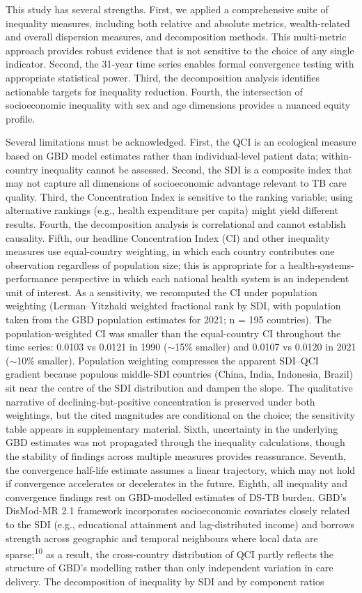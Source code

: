 \documentclass[12pt]{article}
\begin{document}
This study has several strengths. First, we applied a comprehensive suite of inequality measures, including both relative and absolute metrics, wealth-related and overall dispersion measures, and decomposition methods. This multi-metric approach provides robust evidence that is not sensitive to the choice of any single indicator. Second, the 31-year time series enables formal convergence testing with appropriate statistical power. Third, the decomposition analysis identifies actionable targets for inequality reduction. Fourth, the intersection of socioeconomic inequality with sex and age dimensions provides a nuanced equity profile.

Several limitations must be acknowledged. First, the QCI is an ecological measure based on GBD model estimates rather than individual-level patient data; within-country inequality cannot be assessed. Second, the SDI is a composite index that may not capture all dimensions of socioeconomic advantage relevant to TB care quality. Third, the Concentration Index is sensitive to the ranking variable; using alternative rankings (e.g., health expenditure per capita) might yield different results. Fourth, the decomposition analysis is correlational and cannot establish causality. Fifth, our headline Concentration Index (CI) and other inequality measures use equal-country weighting, in which each country contributes one observation regardless of population size; this is appropriate for a health-systems-performance perspective in which each national health system is an independent unit of interest. As a sensitivity, we recomputed the CI under population weighting (Lerman--Yitzhaki weighted fractional rank by SDI, with population taken from the GBD population estimates for 2021; n = 195 countries). The population-weighted CI was smaller than the equal-country CI throughout the time series: 0.0103 vs 0.0121 in 1990 ($\sim$15\% smaller) and 0.0107 vs 0.0120 in 2021 ($\sim$10\% smaller). Population weighting compresses the apparent SDI--QCI gradient because populous middle-SDI countries (China, India, Indonesia, Brazil) sit near the centre of the SDI distribution and dampen the slope. The qualitative narrative of declining-but-positive concentration is preserved under both weightings, but the cited magnitudes are conditional on the choice; the sensitivity table appears in supplementary material. Sixth, uncertainty in the underlying GBD estimates was not propagated through the inequality calculations, though the stability of findings across multiple measures provides reassurance. Seventh, the convergence half-life estimate assumes a linear trajectory, which may not hold if convergence accelerates or decelerates in the future. Eighth, all inequality and convergence findings rest on GBD-modelled estimates of DS-TB burden. GBD's DisMod-MR 2.1 framework incorporates socioeconomic covariates closely related to the SDI (e.g., educational attainment and lag-distributed income) and borrows strength across geographic and temporal neighbours where local data are sparse;\textsuperscript{10} as a result, the cross-country distribution of QCI partly reflects the structure of GBD's modelling rather than only independent variation in care delivery. The decomposition of inequality by SDI and by component ratios 
\end{document}
